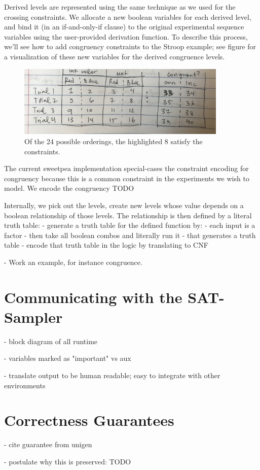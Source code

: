 Derived levels are represented using the same technique as we used for the crossing constraints. We allocate a new boolean variables for each derived level, and bind it (in an if-and-only-if clause) to the original experimental sequence variables using the user-provided derivation function. To describe this process, we'll see how to add congruency constraints to the Stroop example; see figure  for a visualization of these new variables for the derived congruence levels.

\begin{figure}[t]
    \centerline{\includegraphics[origin=c,width=10cm]{fig_congruence_vars_stroop}}
    \caption{Of the 24 possible orderings, the highlighted 8 satisfy the constraints.}%
    \label{fig:congruence_vars_stroop}%
\end{figure}

The current sweetpea implementation special-cases the constraint encoding for congruency because this is a common constraint in the experiments we wish to model. We encode the congruency TODO


Internally, we pick out the levels, create new levels whose value depends on a boolean relationship of those levels. The relationship is then defined by a literal truth table:
- generate a truth table for the defined function by:
- each input is a factor
- then take all boolean combos and literally run it
- that generates a truth table
- encode that truth table in the logic by translating to CNF

- Work an example, for instance congruence.

\section{Communicating with the SAT-Sampler}

- block diagram of all runtime

- variables marked as "important" vs aux

- translate output to be human readable; easy to integrate with other environments


\section{Correctness Guarantees}

- cite guarantee from unigen

- postulate why this is preserved: TODO

